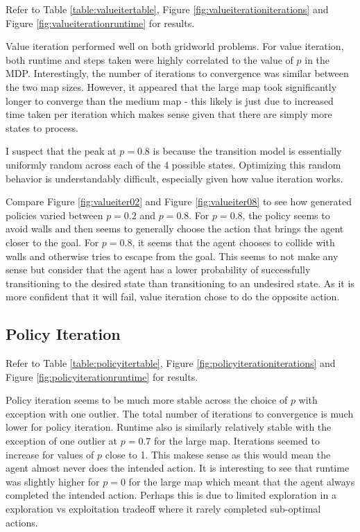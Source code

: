 \documentclass[11pt]{article}
\begin{document}
Refer to Table \ref{table:valueitertable}, Figure \ref{fig:valueiterationiterations} and Figure \ref{fig:valueiterationruntime} for results.





Value iteration performed well on both gridworld problems. For value iteration, both runtime and steps taken were highly correlated to the value of $p$ in the MDP. Interestingly, the number of iterations to convergence was similar between the two map sizes. However, it appeared that the large map took significantly longer to converge than the medium map - this likely is just due to increased time taken per iteration which makes sense given that there are simply more states to process.

I suspect that the peak at $p = 0.8$ is because the transition model is essentially uniformly random across each of the 4 possible states. Optimizing this random behavior is understandably difficult, especially given how value iteration works.

Compare Figure \ref{fig:valueiter02} and Figure \ref{fig:valueiter08} to see how generated policies varied between $p=0.2$ and $p=0.8$. For $p=0.8$, the policy seems to avoid walls and then seems to generally choose the action that brings the agent closer to the goal. For $p=0.8$, it seems that the agent chooses to collide with walls and otherwise tries to escape from the goal. This seems to not make any sense but consider that the agent has a lower probability of successfully transitioning to the desired state than transitioning to an undesired state. As it is more confident that it will fail, value iteration chose to do the opposite action.

\subsection{Policy Iteration}

Refer to Table \ref{table:policyitertable}, Figure \ref{fig:policyiterationiterations} and Figure \ref{fig:policyiterationruntime} for results.





Policy iteration seems to be much more stable across the choice of $p$ with exception with one outlier. The total number of iterations to convergence is much lower for policy iteration. Runtime also is similarly relatively stable with the exception of one outlier at $p=0.7$ for the large map. Iterations seemed to increase for values of $p$ close to 1. This makese sense as this would mean the agent almost never does the intended action. It is interesting to see that runtime was slightly higher for $p=0$ for the large map which meant that the agent always completed the intended action. Perhaps this is due to limited exploration in a exploration vs exploitation tradeoff where it rarely completed sub-optimal actions.
\end{document}
